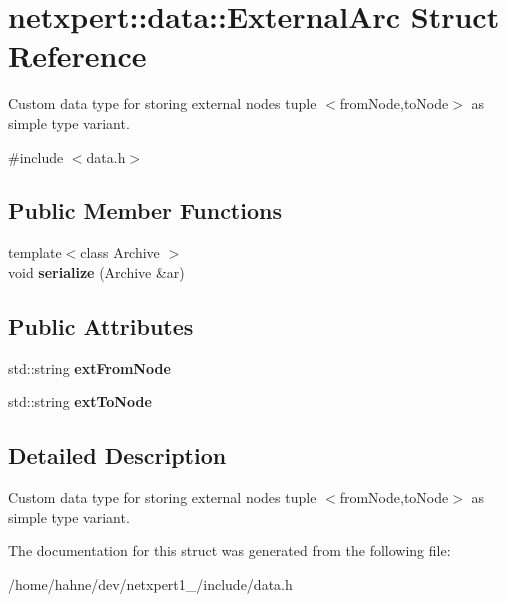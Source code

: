 \hypertarget{structnetxpert_1_1data_1_1ExternalArc}{}\section{netxpert\+:\+:data\+:\+:External\+Arc Struct Reference}
\label{structnetxpert_1_1data_1_1ExternalArc}


Custom data type for storing external nodes tuple $<$from\+Node,to\+Node$>$ as simple type variant.  




{\ttfamily \#include $<$data.\+h$>$}

\subsection*{Public Member Functions}
\begin{DoxyCompactItemize}
\item 
{\footnotesize template$<$class Archive $>$ }\\void {\bfseries serialize} (Archive \&ar)\hypertarget{structnetxpert_1_1data_1_1ExternalArc_ac7c95273f4824d70da14c835ee8af62c}{}\label{structnetxpert_1_1data_1_1ExternalArc_ac7c95273f4824d70da14c835ee8af62c}

\end{DoxyCompactItemize}
\subsection*{Public Attributes}
\begin{DoxyCompactItemize}
\item 
std\+::string {\bfseries ext\+From\+Node}\hypertarget{structnetxpert_1_1data_1_1ExternalArc_ad151959688de67b567d6c6391f9182d4}{}\label{structnetxpert_1_1data_1_1ExternalArc_ad151959688de67b567d6c6391f9182d4}

\item 
std\+::string {\bfseries ext\+To\+Node}\hypertarget{structnetxpert_1_1data_1_1ExternalArc_a9f748154fb313753f42bafb658a47cdf}{}\label{structnetxpert_1_1data_1_1ExternalArc_a9f748154fb313753f42bafb658a47cdf}

\end{DoxyCompactItemize}


\subsection{Detailed Description}
Custom data type for storing external nodes tuple $<$from\+Node,to\+Node$>$ as simple type variant. 

The documentation for this struct was generated from the following file\+:\begin{DoxyCompactItemize}
\item 
/home/hahne/dev/netxpert1\+\_/include/data.\+h\end{DoxyCompactItemize}
